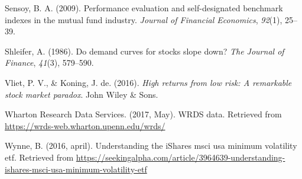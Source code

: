 \documentclass[12pt,twoside]{reedthesis}
\theoremstyle{definition}
\theoremstyle{definition}
\theoremstyle{definition}
\theoremstyle{remark}
\begin{document}
\hypertarget{ref-sensoy2009}{}
Sensoy, B. A. (2009). Performance evaluation and self-designated
benchmark indexes in the mutual fund industry. \emph{Journal of
Financial Economics}, \emph{92}(1), 25--39.

\hypertarget{ref-shleifer1986}{}
Shleifer, A. (1986). Do demand curves for stocks slope down? \emph{The
Journal of Finance}, \emph{41}(3), 579--590.

\hypertarget{ref-van2016}{}
Vliet, P. V., \& Koning, J. de. (2016). \emph{High returns from low
risk: A remarkable stock market paradox}. John Wiley \& Sons.

\hypertarget{ref-wrds2017}{}
Wharton Research Data Services. (2017, May). WRDS data. Retrieved from
\url{https://wrds-web.wharton.upenn.edu/wrds/}

\hypertarget{ref-wynne2016}{}
Wynne, B. (2016, april). Understanding the iShares msci usa minimum
volatility etf. Retrieved from
\url{https://seekingalpha.com/article/3964639-understanding-ishares-msci-usa-minimum-volatility-etf}


\end{document}
